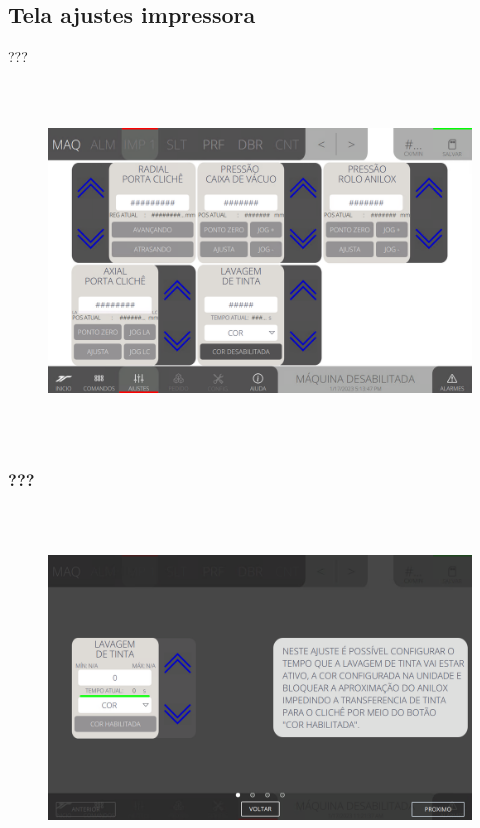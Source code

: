 \thispagestyle{fancy}
\vspace*{\fill}
\subsection{Tela ajustes impressora}
 ???
\begin{figure}[h]
  \centering
  \includegraphics[width=576px,height=360px]{src/imagesFlexo/04-printter/02-printter/settings/e-Tela-Principal.png}
   \label{}
\end{figure}

\newpage
\thispagestyle{fancy}
\vspace*{\fill}
\subsubsection{\small{???}}
\begin{figure}[h]
  \centering
  \includegraphics[width=576px,height=360px]{src/imagesFlexo/04-printter/02-printter/settings/e-1.png}
   \label{}
\end{figure}
\vspace*{\fill}

